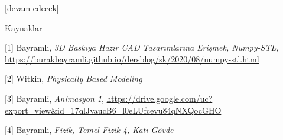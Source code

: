 \documentclass[12pt,fleqn]{article}\usepackage{../../common}
\begin{document}
[devam edecek]

Kaynaklar

[1] Bayramlı, {\em 3D Baskıya Hazır CAD Tasarımlarına Erişmek, Numpy-STL},
    \url{https://burakbayramli.github.io/dersblog/sk/2020/08/numpy-stl.html}

[2] Witkin, {\em Physically Based Modeling}

[3] Bayramli, {\em Animasyon 1},
    \url{https://drive.google.com/uc?export=view&id=17qlJvaucB6_l0eLUfcevu84qNXQocGHO}

[4] Bayramli, {\em Fizik, Temel Fizik 4, Katı Gövde}
    
\end{document}
